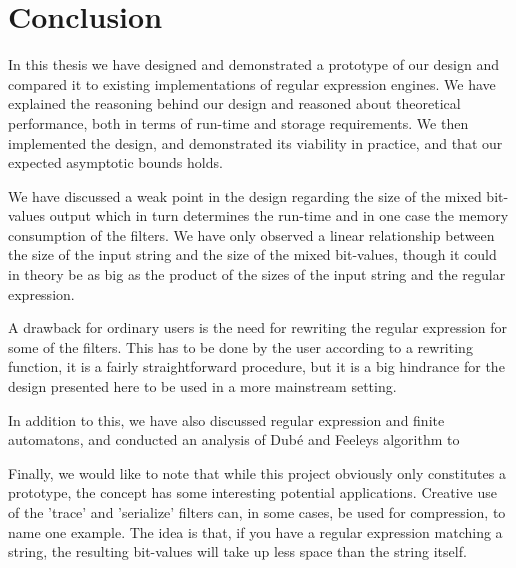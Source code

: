 \section{Conclusion}
\label{sec:conclusion}

In this thesis we have designed and demonstrated a prototype of our
design and compared it to existing implementations of regular
expression engines. We have explained the reasoning behind our design
and reasoned about theoretical performance, both in terms of run-time
and storage requirements. We then implemented the design, and
demonstrated its viability in practice, and that our expected
asymptotic bounds holds.  

We have discussed a weak point in the design regarding the size of the
mixed bit-values output which in turn determines the run-time and in
one case the memory consumption of the filters. We have only observed
a linear relationship between the size of the input string and the
size of the mixed bit-values, though it could in theory be as big as
the product of the sizes of the input string and the regular
expression. 

A drawback for ordinary users is the need for rewriting the regular
expression for some of the filters. This has to be done by the user
according to a rewriting function, it is a fairly straightforward
procedure, but it is a big hindrance for the design presented here to
be used in a more mainstream setting.

In addition to this, we have also discussed regular expression and
finite automatons, and conducted an analysis of Dub\'{e} and Feeleys
algorithm to 

Finally, we would like to note that while this project obviously only
constitutes a prototype, the concept has some interesting potential
applications. Creative use of the 'trace' and 'serialize' filters can,
in some cases, be used for compression, to name one example. The idea
is that, if you have a regular expression matching a string, the
resulting bit-values will take up less space than the string itself.
